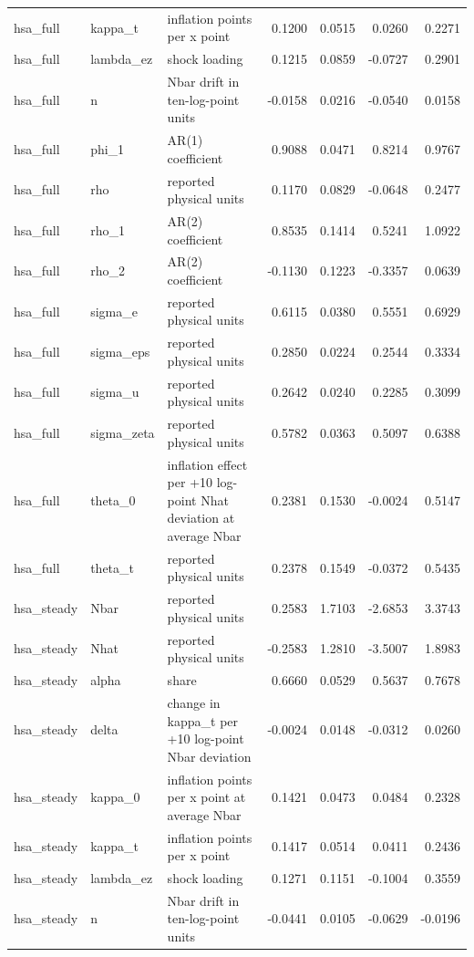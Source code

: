 \begin{tabular}{lllrrrr}
hsa\_full & kappa\_t & inflation points per x point & 0.1200 & 0.0515 & 0.0260 & 0.2271 \\
hsa\_full & lambda\_ez & shock loading & 0.1215 & 0.0859 & -0.0727 & 0.2901 \\
hsa\_full & n & Nbar drift in ten-log-point units & -0.0158 & 0.0216 & -0.0540 & 0.0158 \\
hsa\_full & phi\_1 & AR(1) coefficient & 0.9088 & 0.0471 & 0.8214 & 0.9767 \\
hsa\_full & rho & reported physical units & 0.1170 & 0.0829 & -0.0648 & 0.2477 \\
hsa\_full & rho\_1 & AR(2) coefficient & 0.8535 & 0.1414 & 0.5241 & 1.0922 \\
hsa\_full & rho\_2 & AR(2) coefficient & -0.1130 & 0.1223 & -0.3357 & 0.0639 \\
hsa\_full & sigma\_e & reported physical units & 0.6115 & 0.0380 & 0.5551 & 0.6929 \\
hsa\_full & sigma\_eps & reported physical units & 0.2850 & 0.0224 & 0.2544 & 0.3334 \\
hsa\_full & sigma\_u & reported physical units & 0.2642 & 0.0240 & 0.2285 & 0.3099 \\
hsa\_full & sigma\_zeta & reported physical units & 0.5782 & 0.0363 & 0.5097 & 0.6388 \\
hsa\_full & theta\_0 & inflation effect per +10 log-point Nhat deviation at average Nbar & 0.2381 & 0.1530 & -0.0024 & 0.5147 \\
hsa\_full & theta\_t & reported physical units & 0.2378 & 0.1549 & -0.0372 & 0.5435 \\
hsa\_steady & Nbar & reported physical units & 0.2583 & 1.7103 & -2.6853 & 3.3743 \\
hsa\_steady & Nhat & reported physical units & -0.2583 & 1.2810 & -3.5007 & 1.8983 \\
hsa\_steady & alpha & share & 0.6660 & 0.0529 & 0.5637 & 0.7678 \\
hsa\_steady & delta & change in kappa\_t per +10 log-point Nbar deviation & -0.0024 & 0.0148 & -0.0312 & 0.0260 \\
hsa\_steady & kappa\_0 & inflation points per x point at average Nbar & 0.1421 & 0.0473 & 0.0484 & 0.2328 \\
hsa\_steady & kappa\_t & inflation points per x point & 0.1417 & 0.0514 & 0.0411 & 0.2436 \\
hsa\_steady & lambda\_ez & shock loading & 0.1271 & 0.1151 & -0.1004 & 0.3559 \\
hsa\_steady & n & Nbar drift in ten-log-point units & -0.0441 & 0.0105 & -0.0629 & -0.0196 \\

\end{tabular}
